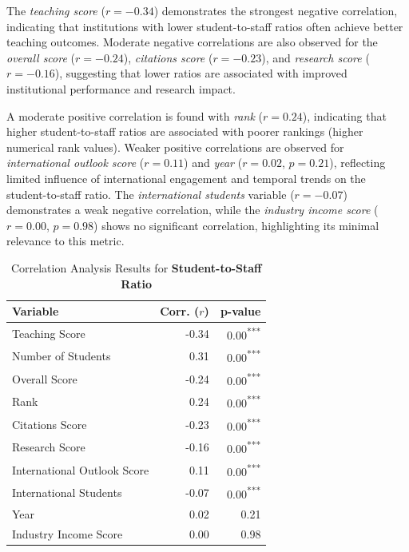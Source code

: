 \documentclass[conference]{IEEEtran}
\begin{document}
The \textit{teaching score} ($r = -0.34$) demonstrates the strongest negative correlation, indicating that institutions with lower student-to-staff ratios often achieve better teaching outcomes. Moderate negative correlations are also observed for the \textit{overall score} ($r = -0.24$), \textit{citations score} ($r = -0.23$), and \textit{research score} ($r = -0.16$), suggesting that lower ratios are associated with improved institutional performance and research impact.

A moderate positive correlation is found with \textit{rank} ($r = 0.24$), indicating that higher student-to-staff ratios are associated with poorer rankings (higher numerical rank values). Weaker positive correlations are observed for \textit{international outlook score} ($r = 0.11$) and \textit{year} ($r = 0.02$, $p = 0.21$), reflecting limited influence of international engagement and temporal trends on the student-to-staff ratio. The \textit{international students} variable ($r = -0.07$) demonstrates a weak negative correlation, while the \textit{industry income score} ($r = 0.00$, $p = 0.98$) shows no significant correlation, highlighting its minimal relevance to this metric.

\begin{table}[h!]
	\centering
	\caption{Correlation Analysis Results for \textbf{Student-to-Staff Ratio}}
	\label{tab:correlation_student_staff_ratio}
	\begin{tabular}{|l|r|r|}
		\hline
		\textbf{Variable} & \textbf{Corr. ($r$)} & \textbf{p-value} \\
		\hline
		Teaching Score & -0.34 & 0.00\textsuperscript{***} \\
		Number of Students & 0.31 & 0.00\textsuperscript{***} \\
		Overall Score & -0.24 & 0.00\textsuperscript{***} \\
		Rank & 0.24 & 0.00\textsuperscript{***} \\
		Citations Score & -0.23 & 0.00\textsuperscript{***} \\
		Research Score & -0.16 & 0.00\textsuperscript{***} \\
		International Outlook Score & 0.11 & 0.00\textsuperscript{***} \\
		International Students & -0.07 & 0.00\textsuperscript{***} \\
		Year & 0.02 & 0.21 \\
		Industry Income Score & 0.00 & 0.98 \\
		\hline
	\end{tabular}
\end{table}
\end{document}
